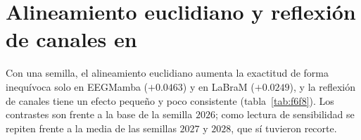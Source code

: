 \section{Alineamiento euclidiano y reflexión de canales en \loso{}}
\label{sec:f6f8}

Con una semilla, el alineamiento euclidiano aumenta la exactitud \loso{} de forma inequívoca solo en
EEGMamba ($+0.0463$) y en LaBraM ($+0.0249$), y la reflexión de canales tiene un efecto pequeño y poco
consistente (tabla~\ref{tab:f6f8}). Los contrastes son frente a la base \loso{} de la semilla $2026$; como
lectura de sensibilidad se repiten frente a la media de las semillas $2027$ y $2028$, que sí tuvieron
recorte.

\begin{table}[H]
\centering
\caption{\loso{} con alineamiento euclidiano y con reflexión de canales menos la base \loso{} de la
semilla $2026$, sobre los $54$ participantes; $p_{\text{Holm}}$ dentro de la familia de cuatro. Margen mín. y
Lectura como en la tabla~\ref{tab:ablaciones-f4}, con las cotas de la sección~\ref{sec:confusor}.}
\label{tab:f6f8}
\footnotesize
\setlength{\tabcolsep}{3pt}
\end{table}

